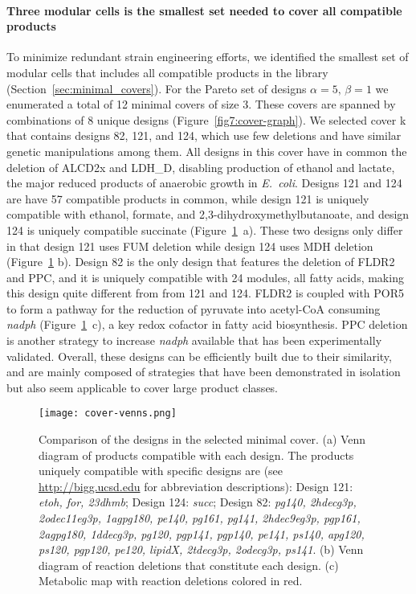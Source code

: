 {\paragraph{Three modular cells is the smallest set needed to cover all compatible products}
To minimize redundant strain engineering efforts, we identified the smallest set of modular cells that includes all compatible products in the library (Section~\ref{sec:minimal_covers}).
For the Pareto set of designs $\alpha=5,\,\beta=1$ we  enumerated a total of 12 minimal covers of size 3.
These covers are spanned by combinations of 8 unique designs (Figure~\ref{fig7:cover-graph}).
We selected cover k that contains designs 82, 121, and 124, which use few deletions and have similar genetic manipulations among them.
All designs in this cover have in common the deletion of ALCD2x and LDH\_D, disabling production of ethanol and lactate, the major reduced products of anaerobic growth in \textit{E.~coli}.
Designs 121 and 124 are have 57 compatible products in common, while design 121 is uniquely compatible with ethanol, formate, and 2,3-dihydroxymethylbutanoate, and design 124 is uniquely compatible succinate (Figure~\ref{fig7:design-comparison}~a).
These two designs only differ in that design 121 uses FUM deletion while design 124 uses MDH deletion (Figure~\ref{fig7:design-comparison} b).
Design 82 is the only design that features the deletion of FLDR2 and PPC, and it is uniquely compatible with 24 modules, all fatty acids, making this design quite different from from 121 and 124.
FLDR2 is coupled with POR5 to form a pathway for the reduction of pyruvate into acetyl-CoA consuming \textit{nadph} (Figure~\ref{fig7:design-comparison}~c), a key redox cofactor in fatty acid biosynthesis.
PPC deletion is another strategy to increase \textit{nadph} available that has been experimentally validated. \citep{chemler2010}
Overall, these designs can be efficiently built due to their similarity,  and are mainly composed of strategies that have been demonstrated in isolation but also seem applicable to cover large product classes.

\begin{figure}[hp]
    \centering
    \texttt{[image: cover-venns.png]}
    \caption[Comparison of the designs in the selected minimal cover]{Comparison of the designs in the selected minimal cover. (a) Venn diagram of products compatible with each design. The products uniquely compatible with specific designs are (see \protect\url{http://bigg.ucsd.edu} for abbreviation descriptions):
       Design 121: \textit{etoh, for, 23dhmb};
       Design 124: \textit{succ};
       Design 82: \textit{pg140, 2hdecg3p, 2odec11eg3p, 1agpg180, pe140, pg161, pg141, 2hdec9eg3p, pgp161, 2agpg180, 1ddecg3p, pg120, pgp141, pgp140, pe141, ps140, apg120, ps120, pgp120, pe120, lipidX, 2tdecg3p, 2odecg3p, ps141}.
    (b) Venn diagram of reaction deletions that constitute each design.
    (c) Metabolic map with reaction deletions colored in red.
       }
    \label{fig7:design-comparison}
\end{figure}


}
